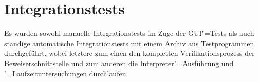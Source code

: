 \section{Integrationstests}

Es wurden sowohl manuelle Integrationstests im Zuge der GUI"=Tests als
auch ständige automatische Integrationstests mit einem Archiv aus
Testprogrammen durchgeführt, wobei letztere zum einen den kompletten
Verifikationsprozess der Beweiserschnittstelle und zum anderen die
Interpreter"=Ausführung und "=Laufzeituntersuchungen durchlaufen.
